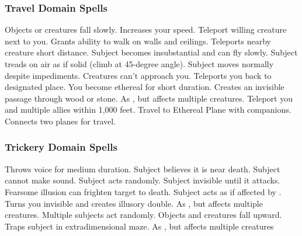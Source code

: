 \subsubsection{Travel Domain Spells}

\begin{spelllist}
     Objects or creatures fall slowly.
     Increases your speed.
     Teleport willing creature next to you.
     Grants ability to walk on walls and ceilings.
     Teleports nearby creature short distance.
     Subject becomes insubstantial and can fly slowly.
     Subject treads on air as if solid (climb at 45-degree angle).
     Subject moves normally despite impediments.
    \spellhead[5]{}
    \spellhead[5]{}
     Creatures can't approach you.
     Teleports you back to designated place.
     You become ethereal for short duration.
     Creates an invisible passage through wood or stone.
     As , but affects multiple creatures.
     Teleport you and multiple allies within 1,000 feet.
     Travel to Ethereal Plane with companions.
     Connects two planes for travel.
\end{spelllist}

\subsubsection{Trickery Domain Spells}

\begin{spelllist}
    \spellhead[1]{}
     Throws voice for medium duration.
     Subject believes it is near death.
     Subject cannot make sound.
     Subject acts randomly.
     Subject invisible until it attacks.
    \spellhead[4]{}
     Fearsome illusion can frighten target to death.
    \spellhead[5]{}
     Subject acts as if affected by .
     Turns you invisible and creates illusory double.
    \spellhead[6]{}
     As , but affects multiple creatures.
     Multiple subjects act randomly.
    \spellhead[8]{}
     Objects and creatures fall upward.
     Traps subject in extradimensional maze.
     As , but affects multiple creatures
\end{spelllist}

